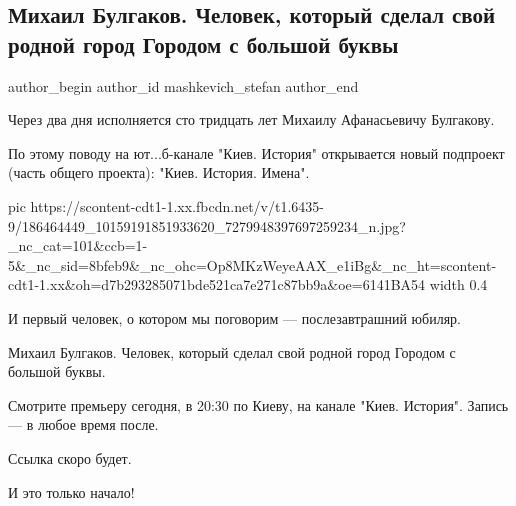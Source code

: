  
 
 
 
 
 
\subsection{Михаил Булгаков. Человек, который сделал свой родной город Городом с большой буквы}
\label{sec:13_05_2021.fb.mashkevich_stefan.1.gorod_bulgakov}
 
\ifcmt
 author_begin
   author_id mashkevich_stefan
 author_end
\fi

Через два дня исполняется сто тридцать лет Михаилу Афанасьевичу Булгакову.

По этому поводу на ют...б-канале "Киев. История" открывается новый подпроект
(часть общего проекта): "Киев. История. Имена".

\ifcmt
  pic https://scontent-cdt1-1.xx.fbcdn.net/v/t1.6435-9/186464449_10159191851933620_7279948397697259234_n.jpg?_nc_cat=101&ccb=1-5&_nc_sid=8bfeb9&_nc_ohc=Op8MKzWeyeAAX_e1iBg&_nc_ht=scontent-cdt1-1.xx&oh=d7b293285071bde521ca7e271c87bb9a&oe=6141BA54
  width 0.4
\fi

И первый человек, о котором мы поговорим — послезавтрашний юбиляр.

Михаил Булгаков. Человек, который сделал свой родной город Городом с большой
буквы.

Смотрите премьеру сегодня, в 20:30 по Киеву, на канале "Киев. История". Запись
— в любое время после.

Ссылка скоро будет.

И это только начало!

